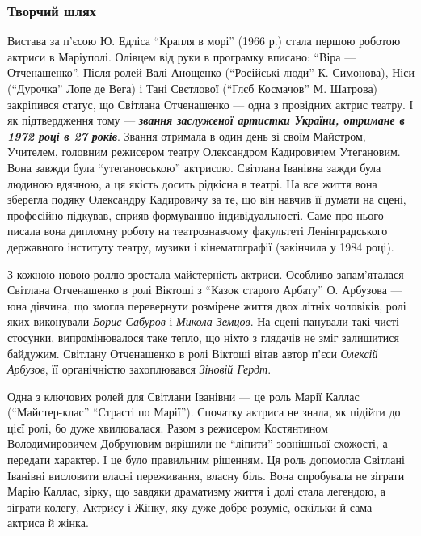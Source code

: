 \subsubsection{Творчий шлях}

Вистава за п'єсою Ю. Едліса \enquote{Крапля в морі} (1966 р.) стала першою роботою
актриси в Маріуполі. Олівцем від руки в програмку вписано: \enquote{Віра —
Отченашенко}. Після ролей Валі Анощенко (\enquote{Російські люди} К. Симонова), Ніси
(\enquote{Дурочка} Лопе де Вега) і Тані Свєтлової (\enquote{Глєб Космачов} М. Шатрова)
закріпився статус, що Світлана Отченашенко — одна з провідних актрис театру. І
як підтвердження тому — \emph{\textbf{звання заслуженої артистки України, отримане в 1972
році в 27 років}}. Звання отримала в один день зі своїм Майстром, Учителем,
головним режисером театру Олександром Кадировичем Утегановим. Вона завжди була
\enquote{утегановською} актрисою. Світлана Іванівна зажди була людиною вдячною, а ця
якість досить рідкісна в театрі. На все життя вона зберегла подяку Олександру
Кадировичу за те, що він навчив її думати на сцені, професійно підкував, сприяв
формуванню індивідуальності. Саме про нього писала вона дипломну роботу на
театрознавчому факультеті Ленінградського державного інституту театру, музики і
кінематографії (закінчила у 1984 році).


З кожною новою роллю зростала майстерність актриси. Особливо запам'яталася
Світлана Отченашенко в ролі Віктоші з \enquote{Казок старого Арбату} О. Арбузова — юна
дівчина, що змогла перевернути розмірене життя двох літніх чоловіків, ролі яких
виконували \emph{Борис Сабуров} і \emph{Микола Земцов}. На сцені панували такі чисті
стосунки, випромінювалося таке тепло, що ніхто з глядачів не зміг залишитися
байдужим. Світлану Отченашенко в ролі Віктоші вітав автор п'єси \emph{Олексій
Арбузов}, її органічністю захоплювався \emph{Зіновій Гердт}.


Одна з ключових ролей для Світлани Іванівни — це роль Марії Каллас
(\enquote{Майстер-клас} \enquote{Страсті по Марії}). Спочатку актриса не знала, як підійти до
цієї ролі, бо дуже хвилювалася. Разом з режисером Костянтином Володимировичем
Добруновим вирішили не \enquote{ліпити} зовнішньої схожості, а передати характер. І це
було правильним рішенням. Ця роль допомогла Світлані Іванівні висловити власні
переживання, власну біль. Вона спробувала не зіграти Марію Каллас, зірку, що
завдяки драматизму життя і долі стала легендою, а зіграти колегу, Актрису і
Жінку, яку дуже добре розуміє, оскільки й сама — актриса й жінка. 

